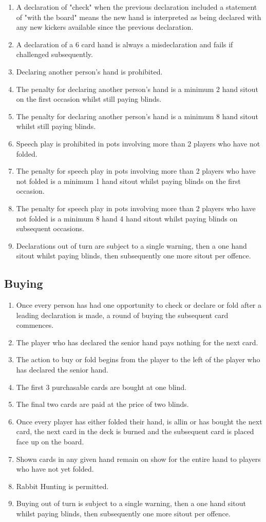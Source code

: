 \documentclass[a4paper,12pt]{article}
\begin{document}
\begin{enumerate}
\item A declaration of "check" when the previous declaration included a statement of "with the board" means the new hand is interpreted as being declared with any new kickers available since the previous declaration.
\item A declaration of a 6 card hand is always a misdeclaration and fails if challenged subsequently.
\item Declaring another person's hand is prohibited.
\item The penalty for declaring another person's hand is a minimum 2 hand sitout on the first occasion whilst still paying blinds.
\item The penalty for declaring another person's hand is a minimum 8 hand sitout whilst still paying blinds.
\item Speech play is prohibited in pots involving more than 2 players who have not folded.
\item The penalty for speech play in pots involving more than 2 players who have not folded is a minimum 1 hand sitout whilst paying blinds on the first occasion.
\item The penalty for speech play in pots involving more than 2 players who have not folded is a minimum 8 hand 4 hand sitout whilst paying blinds on subsequent occasions.
\item Declarations out of turn are subject to a single warning, then a one hand sitout whilst paying blinds, then subsequently one more sitout per offence.

\end{enumerate}
\subsection{Buying}
\begin{enumerate}
\item Once every person has had one opportunity to check or declare or fold after a leading declaration is made, a round of buying the subsequent card commences.
\item The player who has declared the senior hand pays nothing for the next card.
\item The action to buy or fold begins from the player to the left of the player who has declared the senior hand.
\item The first 3 purchasable cards are bought at one blind.
\item The final two cards are paid at the price of two blinds.
\item Once every player has either folded their hand, is allin or has bought the next card, the next card in the deck is burned and the subsequent card is placed face up on the board.
\item Shown cards in any given hand remain on show for the entire hand to players who have not yet folded.
\item Rabbit Hunting is permitted.
\item Buying out of turn is subject to a single warning, then a one hand sitout whilst paying blinds, then subsequently one more sitout per offence.
\end{enumerate}
\end{document}
